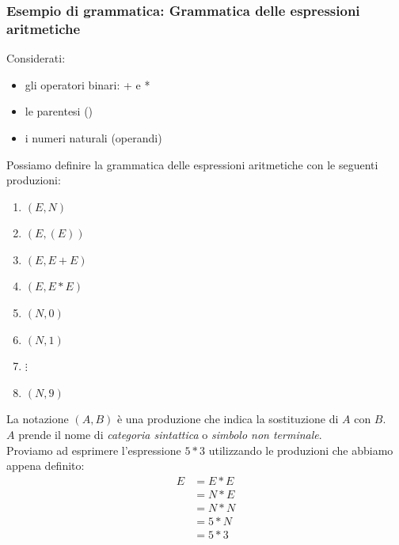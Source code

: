 \documentclass{article}
\begin{document}
\subsubsection*{Esempio di grammatica: Grammatica delle espressioni aritmetiche}
Considerati:
\begin{itemize}
  \item gli operatori binari: + e *
  \item le parentesi ()
  \item i numeri naturali (operandi)
\end{itemize}
Possiamo definire la grammatica delle espressioni aritmetiche con le seguenti produzioni:
\begin{enumerate}
  \item \(\left( E, N \right)\)
  \item \(\left( E, \left(E\right) \right)\)
  \item \(\left( E, E + E \right)\)
  \item \(\left( E, E * E \right)\)
  \item \(\left( N, 0 \right)\)
  \item \(\left( N, 1 \right)\)
  \item \(\vdots\)
  \item \(\left( N, 9 \right)\)
\end{enumerate}
La notazione \(\left(A, B\right)\) è una produzione che indica la sostituzione di \(A\) con \(B\). \\
\(A\) prende il nome di \emph{categoria sintattica} o \emph{simbolo non terminale}. \\
Proviamo ad esprimere l'espressione \(5 * 3\) utilizzando le produzioni che abbiamo appena definito:
\begin{align*}
  E & = E * E \\
    & = N * E \\
    & = N * N \\
    & = 5 * N \\
    & = 5 * 3
\end{align*}
\end{document}
